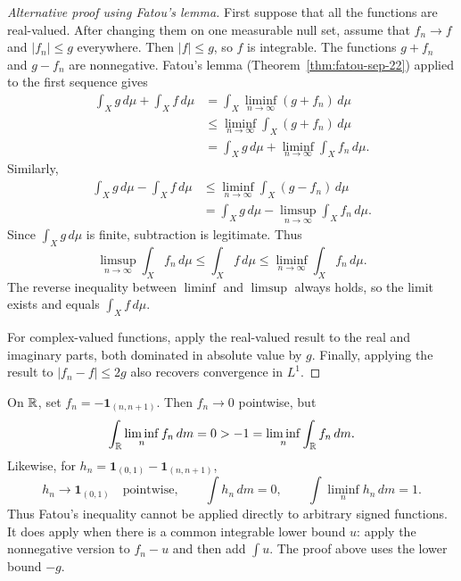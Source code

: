 \begin{proof}[Alternative proof using Fatou's lemma]
  First suppose that all the functions are real-valued. After changing
  them on one measurable null set, assume that $f_n\to f$ and
  $|f_n|\leq g$ everywhere. Then $|f|\leq g$, so $f$ is integrable.
  The functions $g+f_n$ and $g-f_n$ are nonnegative. Fatou's lemma
  (Theorem~\ref{thm:fatou-sep-22}) applied to the first sequence gives
  \begin{align*}
    \int_X g\,d\mu+\int_X f\,d\mu
      &=\int_X\liminf_{n\to\infty}(g+f_n)\,d\mu\\
      &\leq\liminf_{n\to\infty}\int_X(g+f_n)\,d\mu\\
      &=\int_X g\,d\mu+\liminf_{n\to\infty}\int_X f_n\,d\mu.
  \end{align*}
  Similarly,
  \begin{align*}
    \int_X g\,d\mu-\int_X f\,d\mu
      &\leq\liminf_{n\to\infty}\int_X(g-f_n)\,d\mu\\
      &=\int_X g\,d\mu-\limsup_{n\to\infty}\int_X f_n\,d\mu.
  \end{align*}
  Since $\int_X g\,d\mu$ is finite, subtraction is legitimate. Thus
  \[
    \limsup_{n\to\infty}\int_X f_n\,d\mu
      \leq\int_X f\,d\mu
      \leq\liminf_{n\to\infty}\int_X f_n\,d\mu.
  \]
  The reverse inequality between $\liminf$ and $\limsup$ always
  holds, so the limit exists and equals $\int_X f\,d\mu$.

  For complex-valued functions, apply the real-valued result to the
  real and imaginary parts, both dominated in absolute value by $g$.
  Finally, applying the result to $|f_n-f|\leq2g$ also recovers
  convergence in $L^1$.
\end{proof}

\begin{example}
  On $\mathbb{R}$, set $f_n=-\mathbf 1_{(n,n+1)}$. Then $f_n\to0$
  pointwise, but
  \[
    \int_{\mathbb{R}}\liminf_n f_n\,dm=0
      >-1=\liminf_n\int_{\mathbb{R}}f_n\,dm.
  \]
  Likewise, for $h_n=\mathbf 1_{(0,1)}-\mathbf 1_{(n,n+1)}$,
  \[
    h_n\longrightarrow\mathbf 1_{(0,1)}\quad\text{pointwise},
    \qquad \int h_n\,dm=0,
    \qquad \int\liminf_n h_n\,dm=1.
  \]
  Thus Fatou's inequality cannot be applied directly to arbitrary
  signed functions. It does apply when there is a common integrable
  lower bound $u$: apply the nonnegative version to $f_n-u$ and then
  add $\int u$. The proof above uses the lower bound $-g$.
\end{example}


